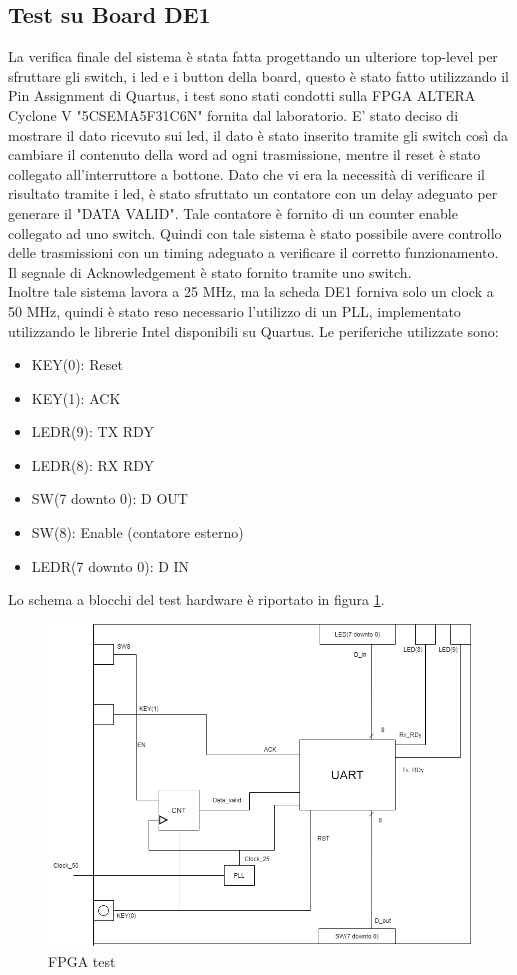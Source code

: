 \documentclass[a4paper, titlepage]{article}
\begin{document}
\subsection{Test su Board DE1}
La verifica finale del sistema è stata fatta progettando un ulteriore top-level per sfruttare gli switch, i led e i button della board, questo è stato fatto utilizzando il Pin Assignment di Quartus, i test sono stati condotti sulla  FPGA ALTERA Cyclone V "5CSEMA5F31C6N" fornita dal laboratorio. E' stato deciso di mostrare il dato ricevuto sui led, il dato è stato inserito tramite gli switch così da cambiare il contenuto della word ad ogni trasmissione, mentre il reset è stato collegato all'interruttore a bottone. Dato che vi era la necessità di verificare il risultato tramite i led, è stato sfruttato un contatore con un delay adeguato per generare il "DATA \textunderscore VALID". Tale contatore è fornito di un counter enable collegato ad uno switch. Quindi con tale sistema è stato possibile avere controllo delle trasmissioni con un timing adeguato a verificare il corretto funzionamento. Il segnale di Acknowledgement è stato fornito tramite uno switch.\\Inoltre tale sistema lavora a 25 MHz, ma la scheda DE1 forniva solo un clock a 50 MHz, quindi è stato reso necessario l'utilizzo di un PLL, implementato utilizzando le librerie Intel disponibili su Quartus.
\newline
Le periferiche utilizzate sono:
\begin{itemize}
    \item KEY(0): Reset
    \item KEY(1): ACK
    \item LEDR(9): TX \textunderscore RDY
    \item LEDR(8): RX \textunderscore RDY
    \item SW(7 downto 0): D \textunderscore OUT
    \item SW(8): Enable (contatore esterno)
    \item LEDR(7 downto 0): D \textunderscore IN
\end{itemize}
Lo schema a blocchi del test hardware è riportato in figura \ref{fig:Fpgatest}.
\begin{figure}[!h]
    \centering
    \includegraphics[scale=0.5]{FPGAtest.png}
    \caption{FPGA test}
    \label{fig:Fpgatest}
\end{figure}
\end{document}
